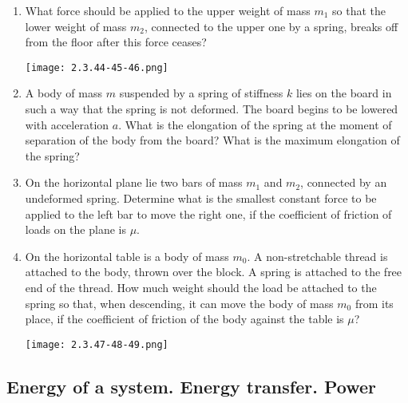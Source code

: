 \documentclass{article}
\begin{document}
\begin{enumerate}[label=2.3.\arabic*]
\item  What force should be applied to the upper weight of mass $m_1$ so that the lower weight of mass $m_2$, connected to the upper one by a spring, breaks off from the floor after this force ceases?

\begin{center}
    \texttt{[image: 2.3.44-45-46.png]}
\end{center}


\item  A body of mass $m$ suspended by a spring of stiffness $k$ lies on the board in such a way that the spring is not deformed. The board begins to be lowered with acceleration $a$. What is the elongation of the spring at the moment of separation of the body from the board? What is the maximum elongation of the spring?

\item  On the horizontal plane lie two bars of mass $m_1$ and $m_2$, connected by an undeformed spring. Determine what is the smallest constant force to be applied to the left bar to move the right one, if the coefficient of friction of loads on the plane is $\mu$.

\item  On the horizontal table is a body of mass $m_0$. A non-stretchable thread is attached to the body, thrown over the block. A spring is attached to the free end of the thread. How much weight should the load be attached to the spring so that, when descending, it can move the body of mass $m_0$ from its place, if the coefficient of friction of the body against the table is $\mu$? 

\begin{center}
    \texttt{[image: 2.3.47-48-49.png]}
\end{center}




\end{enumerate}



\subsection{Energy of a system. Energy transfer. Power}
\end{document}
